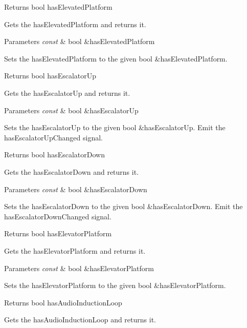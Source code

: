 \begin{DoxyReturn}{Returns}
bool has\+Elevated\+Platform
\end{DoxyReturn}
Gets the has\+Elevated\+Platform and returns it.


\begin{DoxyParams}{Parameters}
{\em const} & bool \&has\+Elevated\+Platform\\
\hline
\end{DoxyParams}
Sets the has\+Elevated\+Platform to the given bool \&has\+Elevated\+Platform.

\begin{DoxyReturn}{Returns}
bool has\+Escalator\+Up
\end{DoxyReturn}
Gets the has\+Escalator\+Up and returns it.


\begin{DoxyParams}{Parameters}
{\em const} & bool \&has\+Escalator\+Up\\
\hline
\end{DoxyParams}
Sets the has\+Escalator\+Up to the given bool \&has\+Escalator\+Up. Emit the has\+Escalator\+Up\+Changed signal.

\begin{DoxyReturn}{Returns}
bool has\+Escalator\+Down
\end{DoxyReturn}
Gets the has\+Escalator\+Down and returns it.


\begin{DoxyParams}{Parameters}
{\em const} & bool \&has\+Escalator\+Down\\
\hline
\end{DoxyParams}
Sets the has\+Escalator\+Down to the given bool \&has\+Escalator\+Down. Emit the has\+Escalator\+Down\+Changed signal.

\begin{DoxyReturn}{Returns}
bool has\+Elevator\+Platform
\end{DoxyReturn}
Gets the has\+Elevator\+Platform and returns it.


\begin{DoxyParams}{Parameters}
{\em const} & bool \&has\+Elevator\+Platform\\
\hline
\end{DoxyParams}
Sets the has\+Elevator\+Platform to the given bool \&has\+Elevator\+Platform.

\begin{DoxyReturn}{Returns}
bool has\+Audio\+Induction\+Loop
\end{DoxyReturn}
Gets the has\+Audio\+Induction\+Loop and returns it.


